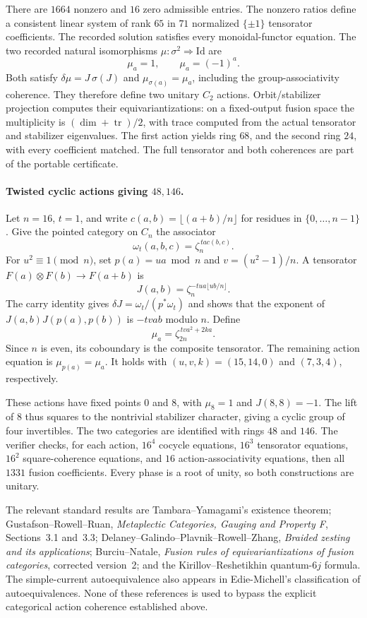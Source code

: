There are $1664$ nonzero and $16$ zero admissible entries.  The nonzero
ratios define a consistent linear system of rank $65$ in $71$ normalized
$\{\pm1\}$ tensorator coefficients.  The recorded solution satisfies
every monoidal-functor equation.  The two recorded natural isomorphisms
$\mu:\sigma^2\Rightarrow\mathrm{Id}$ are
\[
 \mu_a=1,\qquad \mu_a=(-1)^a.
\]
Both satisfy $\delta\mu=J\,\sigma(J)$ and
$\mu_{\sigma(a)}=\mu_a$, including the group-associativity coherence.
They therefore define two unitary $C_2$ actions.  Orbit/stabilizer
projection computes their equivariantizations: on a fixed-output fusion
space the multiplicity is $(\dim+\operatorname{tr})/2$, with trace
computed from the actual tensorator and stabilizer eigenvalues.  The
first action yields ring $68$, and the second ring $24$, with every
coefficient matched.  The full tensorator and both coherences are
part of the portable certificate.

\paragraph{Twisted cyclic actions giving $48,146$.}
Let $n=16$, $t=1$, and write $c(a,b)=\lfloor(a+b)/n\rfloor$ for
residues in $\{0,\ldots,n-1\}$.  Give the pointed category on $C_n$
the associator
\[
 \omega_t(a,b,c)=\zeta_n^{\,t a c(b,c)}.
\]
For $u^2\equiv1\pmod n$, set $p(a)=ua\bmod n$ and
$v=(u^2-1)/n$.  A tensorator $F(a)\otimes F(b)\to F(a+b)$ is
\[
 J(a,b)=\zeta_n^{-tua\lfloor ub/n\rfloor}.
\]
The carry identity gives
$\delta J=\omega_t/(p^*\omega_t)$ and shows that the exponent of
$J(a,b)J(p(a),p(b))$ is $-tvab$ modulo $n$.  Define
\[
 \mu_a=\zeta_{2n}^{\,tv a^2+2ka}.
\]
Since $n$ is even, its coboundary is the composite tensorator.  The
remaining action equation is $\mu_{p(a)}=\mu_a$.  It holds with
$(u,v,k)=(15,14,0)$ and $(7,3,4)$, respectively.

These actions have fixed points $0$ and $8$, with $\mu_8=1$ and
$J(8,8)=-1$.  The lift of $8$ thus squares to the nontrivial stabilizer
character, giving a cyclic group of four invertibles.  The two
categories are identified with rings $48$ and $146$.  The verifier
checks, for each action, $16^4$ cocycle equations, $16^3$ tensorator
equations, $16^2$ square-coherence equations, and $16$ action-associativity
equations, then all $1331$ fusion coefficients.  Every phase is a root
of unity, so both constructions are unitary.

The relevant standard results are Tambara--Yamagami's existence theorem;
Gustafson--Rowell--Ruan, \emph{Metaplectic Categories, Gauging and
Property F}, Sections~3.1 and~3.3; Delaney--Galindo--Plavnik--Rowell--Zhang,
\emph{Braided zesting and its applications}; Burciu--Natale,
\emph{Fusion rules of equivariantizations of fusion categories}, corrected
version~2; and the Kirillov--Reshetikhin quantum-$6j$ formula.  The
simple-current autoequivalence also appears in Edie-Michell's
classification of autoequivalences.  None of these references is used
to bypass the explicit categorical action coherence established above.
